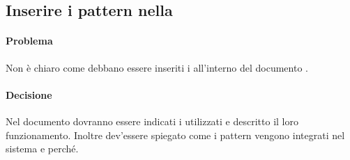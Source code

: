 \subsection{Inserire i pattern nella \ST}
\paragraph{Problema}
Non è chiaro come debbano essere inseriti i  all'interno del documento \ST.
\paragraph{Decisione}
Nel documento \ST dovranno essere indicati i  utilizzati e descritto il loro funzionamento.
Inoltre dev'essere spiegato come i pattern vengono integrati nel sistema e perché.
